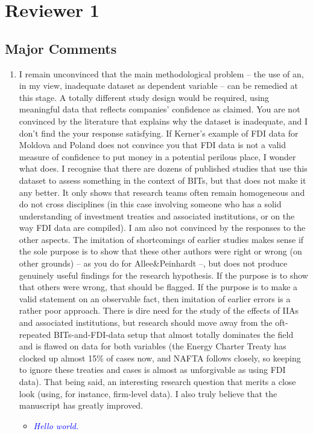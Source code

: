 \section{Reviewer 1}

\subsection{Major Comments}

\begin{enumerate}
	\item  I remain unconvinced that the main methodological problem -- the use of an, in my view, inadequate dataset as dependent variable -- can be remedied at this stage. A totally different study design would be required, using meaningful data that reflects companies' confidence as claimed. You are not convinced by the literature that explains why the dataset is inadequate, and I don't find the your response satisfying. If Kerner's example of FDI data for Moldova and Poland does not convince you that FDI data is not a valid measure of confidence to put money in a potential perilous place, I wonder what does. I recognise that there are dozens of published studies that use this dataset to assess something in the context of BITs, but that does not make it any better. It only shows that research teams often remain homogeneous and do not cross disciplines (in this case involving someone who has a solid understanding of investment treaties and associated institutions, or on the way FDI data are compiled). I am also not convinced by the responses to the other aspects. The imitation of shortcomings of earlier studies makes sense if the sole purpose is to show that these other authors were right or wrong (on other grounds) -- as you do for Allee&Peinhardt --, but does not produce genuinely useful findings for the research hypothesis. If the purpose is to show that others were wrong, that should be flagged. If the purpose is to make a valid statement on an observable fact, then imitation of earlier errors is a rather poor approach. There is dire need for the study of the effects of IIAs and associated institutions, but research should move away from the oft-repeated BITs-and-FDI-data setup that almost totally dominates the field and is flawed on data for both variables (the Energy Charter Treaty has clocked up almost 15\% of cases now, and NAFTA follows closely, so keeping to ignore these treaties and cases is almost as unforgivable as using FDI data). That being said, an interesting research question that merits a close look (using, for instance, firm-level data). I also truly believe that the manuscript has greatly improved.
	\begin{itemize}
		\item \textcolor{blue}{ \emph{
		Hello world.
		}}
	\end{itemize}
\end{enumerate}
